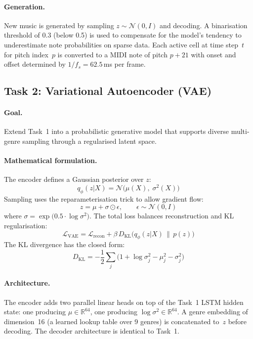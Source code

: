 \documentclass[letterpaper]{article}
\newcommand{\Lcal}{\mathcal{L}}
\newcommand{\Ncal}{\mathcal{N}}
\begin{document}
\paragraph{Generation.}
New music is generated by sampling $z \sim \Ncal(0, I)$ and decoding.
A binarisation threshold of 0.3 (below 0.5) is used to compensate for
the model's tendency to underestimate note probabilities on sparse data.
Each active cell at time step~$t$ for pitch index~$p$ is converted to a
MIDI note of pitch $p + 21$ with onset and offset determined by
$1/f_s = 62.5$\,ms per frame.

\subsection{Task 2: Variational Autoencoder (VAE)}
\label{sec:task2}

\paragraph{Goal.}
Extend Task~1 into a probabilistic generative model that supports diverse
multi-genre sampling through a regularised latent space.

\paragraph{Mathematical formulation.}
The encoder defines a Gaussian posterior over $z$:
\begin{equation}
  q_\phi(z|X) = \Ncal\!\bigl(\mu(X),\;\sigma^2(X)\bigr)
\end{equation}
Sampling uses the reparameterisation trick to allow gradient flow:
\begin{equation}
  z = \mu + \sigma \odot \epsilon, \qquad
  \epsilon \sim \Ncal(0, I)
\end{equation}
where $\sigma = \exp\!\bigl(0.5 \cdot \log\sigma^2\bigr)$.
The total loss balances reconstruction and KL regularisation:
\begin{equation}
  \Lcal_{\mathrm{VAE}} = \Lcal_{\mathrm{recon}}
    + \beta\,D_{\mathrm{KL}}\!\bigl(q_\phi(z|X)\,\|\,p(z)\bigr)
\end{equation}
The KL divergence has the closed form:
\begin{equation}
  D_{\mathrm{KL}} = -\frac{1}{2}\sum_{j}
    \bigl(1 + \log\sigma_j^2 - \mu_j^2 - \sigma_j^2\bigr)
\end{equation}

\paragraph{Architecture.}
The encoder adds two parallel linear heads on top of the Task~1 LSTM
hidden state: one producing $\mu \in \mathbb{R}^{64}$, one producing
$\log\sigma^2 \in \mathbb{R}^{64}$.  A genre embedding of dimension~16
(a learned lookup table over 9 genres) is concatenated to~$z$ before
decoding.  The decoder architecture is identical to Task~1.
\end{document}
